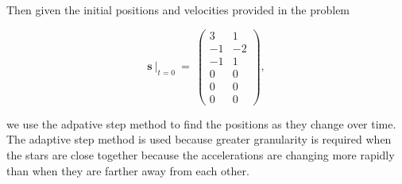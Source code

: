 \documentclass[11pt]{article}
\begin{document}
Then given the initial positions and velocities provided in the problem

\[\mathbf{s}\ \lvert_{t=0}\ =\ \begin{pmatrix}
3 & 1\\
-1 & -2\\
-1 & 1\\
0 & 0\\
0 & 0\\
0 & 0
\end{pmatrix},\]

we use the adpative step method to find the positions as they change
over time. The adaptive step method is used because greater granularity
is required when the stars are close together because the accelerations
are changing more rapidly than when they are farther away from each
other.
\end{document}
